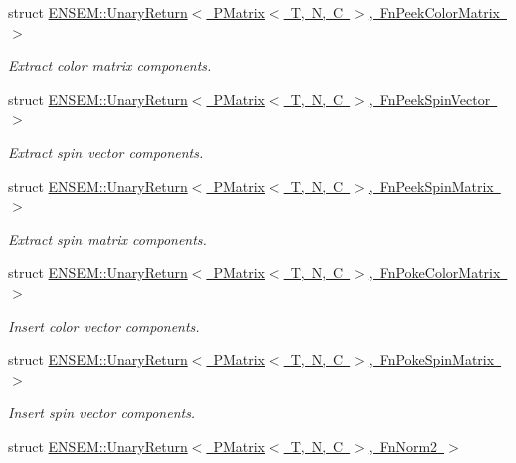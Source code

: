 \begin{DoxyCompactItemize}
\item 
struct \mbox{\hyperlink{structENSEM_1_1UnaryReturn_3_01PMatrix_3_01T_00_01N_00_01C_01_4_00_01FnPeekColorMatrix_01_4}{E\+N\+S\+E\+M\+::\+Unary\+Return$<$ P\+Matrix$<$ T, N, C $>$, Fn\+Peek\+Color\+Matrix $>$}}
\begin{DoxyCompactList}\small\item\em Extract color matrix components. \end{DoxyCompactList}\item 
struct \mbox{\hyperlink{structENSEM_1_1UnaryReturn_3_01PMatrix_3_01T_00_01N_00_01C_01_4_00_01FnPeekSpinVector_01_4}{E\+N\+S\+E\+M\+::\+Unary\+Return$<$ P\+Matrix$<$ T, N, C $>$, Fn\+Peek\+Spin\+Vector $>$}}
\begin{DoxyCompactList}\small\item\em Extract spin vector components. \end{DoxyCompactList}\item 
struct \mbox{\hyperlink{structENSEM_1_1UnaryReturn_3_01PMatrix_3_01T_00_01N_00_01C_01_4_00_01FnPeekSpinMatrix_01_4}{E\+N\+S\+E\+M\+::\+Unary\+Return$<$ P\+Matrix$<$ T, N, C $>$, Fn\+Peek\+Spin\+Matrix $>$}}
\begin{DoxyCompactList}\small\item\em Extract spin matrix components. \end{DoxyCompactList}\item 
struct \mbox{\hyperlink{structENSEM_1_1UnaryReturn_3_01PMatrix_3_01T_00_01N_00_01C_01_4_00_01FnPokeColorMatrix_01_4}{E\+N\+S\+E\+M\+::\+Unary\+Return$<$ P\+Matrix$<$ T, N, C $>$, Fn\+Poke\+Color\+Matrix $>$}}
\begin{DoxyCompactList}\small\item\em Insert color vector components. \end{DoxyCompactList}\item 
struct \mbox{\hyperlink{structENSEM_1_1UnaryReturn_3_01PMatrix_3_01T_00_01N_00_01C_01_4_00_01FnPokeSpinMatrix_01_4}{E\+N\+S\+E\+M\+::\+Unary\+Return$<$ P\+Matrix$<$ T, N, C $>$, Fn\+Poke\+Spin\+Matrix $>$}}
\begin{DoxyCompactList}\small\item\em Insert spin vector components. \end{DoxyCompactList}\item 
struct \mbox{\hyperlink{structENSEM_1_1UnaryReturn_3_01PMatrix_3_01T_00_01N_00_01C_01_4_00_01FnNorm2_01_4}{E\+N\+S\+E\+M\+::\+Unary\+Return$<$ P\+Matrix$<$ T, N, C $>$, Fn\+Norm2 $>$}}
\item 

\end{DoxyCompactItemize}
